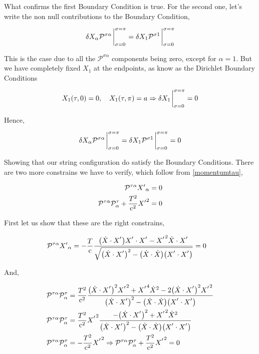 What confirms the first Boundary Condition is true. For the second one, let's write the non null contributions to the 
Boundary Condition,

\begin{align*}
    \delta X_\alpha\mathcal P^{\sigma\alpha}\eval_{\sigma=0}^{\sigma=\pi}=\delta X_1\mathcal P^{\sigma1}\eval_{\sigma=0}^{\sigma=\pi}
\end{align*}

This is the case due to all the $\mathcal P^{\sigma\alpha}$ components being zero, except for $\alpha=1$. But we have completely fixed $X_1$ at the 
endpoints, as know as the Dirichlet Boundary Conditions

\begin{align*}
    X_1\qty(\tau,0)=0,\ \ \ X_1\qty(\tau,\pi)=a\Rightarrow \delta X_1\eval_{\sigma=0}^{\sigma=\pi}=0
\end{align*}

Hence,

\begin{align*}
    \delta X_\alpha\mathcal P^{\sigma\alpha}\eval_{\sigma=0}^{\sigma=\pi}=\delta X_1\mathcal P^{\sigma1}\eval_{\sigma=0}^{\sigma=\pi}=0
\end{align*}

Showing that our string configuration do satisfy the Boundary Conditions. There are two more constrains we have to verify, which follow from \ref{momentumtau},

\begin{align*}
    \mathcal P^{\tau\alpha}{X'}_\alpha&=0\\
    \mathcal P^{\tau\alpha}\mathcal P^{\tau}_\alpha+\frac{T^2}{\textnormal{c}^2}{X'}^2&=0
\end{align*}

First let us show that these are the right constrains,

\begin{align*}
    \mathcal P^{\tau\alpha}{X'}_\alpha&=-\frac{T}{\luz}\frac{\qty(\dot X\cdot X^\sidev){X^\sidev\cdot X^\sidev}-{X^\sidev}^2{\dot X\cdot X^\sidev}}{\sqrt{\qty(\dot X\cdot X^\sidev)^2- \qty(\dot X\cdot \dot X)\qty(X^\sidev\cdot X^\sidev) }}=0
\end{align*}

And,

\begin{align*}
    \mathcal P^{\tau\alpha}\mathcal P^{\tau}_\alpha&=\frac{T^2}{\luz^2}\frac{\qty(\dot X\cdot X^\sidev)^2{X^\sidev}^2+{X^\sidev}^4{\dot X}^2-2\qty(\dot X\cdot X^\sidev)^2{X^\sidev}^2}{\qty(\dot X\cdot X^\sidev)^2- \qty(\dot X\cdot \dot X)\qty(X^\sidev\cdot X^\sidev) }\\
    \mathcal P^{\tau\alpha}\mathcal P^{\tau}_\alpha&=\frac{T^2}{\luz^2}{X^\sidev}^2\frac{-\qty(\dot X\cdot X^\sidev)^2+{X^\sidev}^2{\dot X}^2}{\qty(\dot X\cdot X^\sidev)^2- \qty(\dot X\cdot \dot X)\qty(X^\sidev\cdot X^\sidev) }\\
    \mathcal P^{\tau\alpha}\mathcal P^{\tau}_\alpha&=-\frac{T^2}{\luz^2}{X^\sidev}^2\Rightarrow \mathcal P^{\tau\alpha}\mathcal P^{\tau}_\alpha+\frac{T^2}{\luz^2}{X^\sidev}^2=0
\end{align*}

